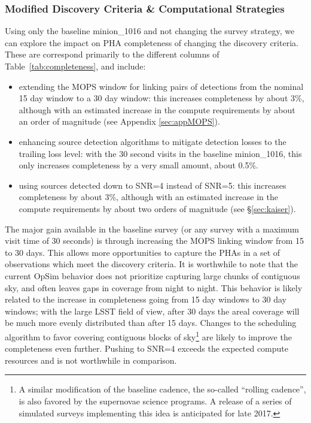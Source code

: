 \subsubsection{Modified Discovery Criteria \& Computational Strategies}

Using only the baseline minion\_1016 and not changing the survey strategy, we can explore the impact on PHA completeness of changing the discovery criteria. These are correspond primarily to the different columns of Table~\ref{tab:completeness}, and include:

\begin{itemize}
\item extending the MOPS window for linking pairs of detections from the nominal 15 day window to a 30 day window: this increases completeness by about 3\%, although with an estimated increase in the compute requirements by about an order of magnitude (see Appendix \ref{sec:appMOPS}).
\item enhancing source detection algorithms to mitigate detection losses to the trailing loss level: with the 30 second visits in the baseline minion\_1016, this only increases completeness by a very small amount, about 0.5\%.
\item using sources detected down to SNR=4 instead of SNR=5: this increases completeness by about 3\%, although with an estimated increase in the compute requirements by about two orders of magnitude (see \S\ref{sec:kaiser}).
\end{itemize}

The major gain available in the baseline survey (or any survey with a maximum visit time of 30 seconds) is through increasing the MOPS linking window from 15 to 30 days. This allows more opportunities to capture the PHAs in a set of observations which meet the discovery criteria. It is worthwhile to note that the current OpSim behavior does not prioritize capturing large chunks of contiguous sky, and often leaves gaps in coverage from night to night. This behavior is likely related to the increase in completeness going from 15 day windows to 30 day windows; with the large LSST field of view, after 30 days the areal coverage will be much more evenly distributed than after 15 days. Changes to the scheduling algorithm to favor covering contiguous blocks of sky\footnote{A similar modification of
the baseline cadence, the so-called ``rolling cadence'', is also favored by the supernovae science programs. A release of a series of simulated surveys implementing this idea is anticipated for late 2017.} are likely to improve the completeness even further.  Pushing to SNR=4 exceeds the expected compute resources and is not worthwhile in comparison.


